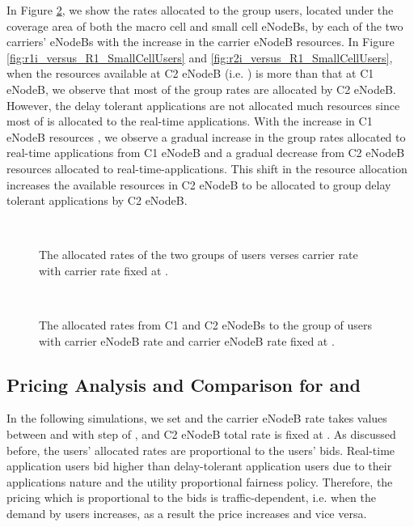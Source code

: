 \documentclass[journal]{IEEEtran} 		\usepackage{amsmath,amssymb}
\begin{document}
In Figure \ref{fig:ri_versus_R1_SmallCell}, we show the rates allocated to the  group users, located under the coverage area of both the macro cell and small cell eNodeBs, by each of the two carriers' eNodeBs with the increase in the  carrier eNodeB resources. In Figure \ref{fig:r1i_versus_R1_SmallCellUsers} and \ref{fig:r2i_versus_R1_SmallCellUsers}, when the resources available at C2 eNodeB (i.e. ) is more than that at C1 eNodeB, we observe that most of the  group rates are allocated by C2 eNodeB. However, the delay tolerant applications are not allocated much resources since most of  is allocated to the real-time applications. With the increase in C1 eNodeB resources , we observe a gradual increase in the  group rates allocated to real-time applications from C1 eNodeB and a gradual decrease from C2 eNodeB resources allocated to real-time-applications. This shift in the resource allocation increases the available resources in C2 eNodeB to be allocated to  group delay tolerant applications by C2 eNodeB.
\begin{figure}[tb]
  \centering
  \\\caption{The allocated rates  of the two groups of users verses  carrier rate  with  carrier rate fixed at .}
\label{fig:ri_versus_R1}
\end{figure}

\begin{figure}[tb]
  \centering
  \\\caption{The allocated rates from C1 and C2 eNodeBs to the  group of users with  carrier eNodeB rate  and  carrier eNodeB rate fixed at .}
\label{fig:ri_versus_R1_SmallCell}
\end{figure}

\subsection{Pricing Analysis and Comparison for  and }
In the following simulations, we set  and the  carrier eNodeB rate  takes values between  and  with step of , and C2 eNodeB total rate is fixed at . As discussed before, the users' allocated rates are proportional to the users' bids. Real-time application users bid higher than delay-tolerant application users due to their applications nature and the utility proportional fairness policy. Therefore, the pricing which is proportional to the bids is traffic-dependent, i.e. when the demand by users increases, as a result the price increases and vice versa.
\end{document}
